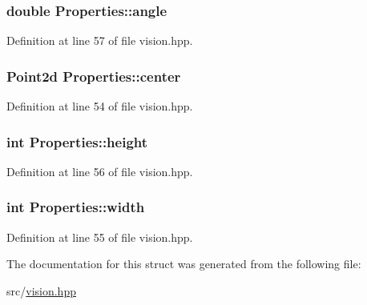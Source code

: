 \subsubsection[{\texorpdfstring{angle}{angle}}]{\setlength{\rightskip}{0pt plus 5cm}double Properties\+::angle}\hypertarget{struct_properties_a82b8fcf59434abb5b9dd4d0a9aa33c0d}{}\label{struct_properties_a82b8fcf59434abb5b9dd4d0a9aa33c0d}


Definition at line 57 of file vision.\+hpp.

\subsubsection[{\texorpdfstring{center}{center}}]{\setlength{\rightskip}{0pt plus 5cm}Point2d Properties\+::center}\hypertarget{struct_properties_a25b18c07da764450131fb8dcce54272e}{}\label{struct_properties_a25b18c07da764450131fb8dcce54272e}


Definition at line 54 of file vision.\+hpp.

\subsubsection[{\texorpdfstring{height}{height}}]{\setlength{\rightskip}{0pt plus 5cm}int Properties\+::height}\hypertarget{struct_properties_a26cfb21bae7a36d08ae4ee73cda4f8bb}{}\label{struct_properties_a26cfb21bae7a36d08ae4ee73cda4f8bb}


Definition at line 56 of file vision.\+hpp.

\subsubsection[{\texorpdfstring{width}{width}}]{\setlength{\rightskip}{0pt plus 5cm}int Properties\+::width}\hypertarget{struct_properties_a0295d49b05722ec51b1525816e607b8c}{}\label{struct_properties_a0295d49b05722ec51b1525816e607b8c}


Definition at line 55 of file vision.\+hpp.



The documentation for this struct was generated from the following file\+:\begin{DoxyCompactItemize}
\item 
src/\hyperlink{vision_8hpp}{vision.\+hpp}\end{DoxyCompactItemize}
